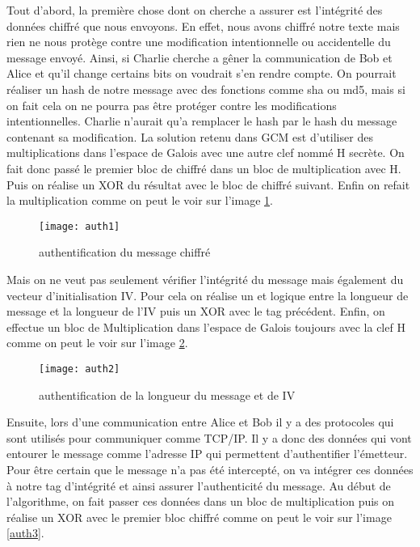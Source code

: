 Tout d'abord, la première chose dont on cherche a assurer est l'intégrité des données chiffré que nous envoyons. En effet, nous avons chiffré notre texte mais rien ne nous protège contre une modification intentionnelle ou accidentelle du message envoyé. Ainsi, si Charlie cherche a gêner la communication de Bob et Alice et qu'il change certains bits on voudrait s'en rendre compte. On pourrait réaliser un hash de notre message avec des fonctions comme sha ou md5, mais si on fait cela on ne pourra pas être protéger contre les modifications intentionnelles. Charlie n'aurait qu'a remplacer le hash par le hash du message contenant sa modification. La solution retenu dans GCM est d'utiliser des multiplications dans l'espace de Galois avec une autre clef nommé H secrète. On fait donc passé le premier bloc de chiffré dans un bloc de multiplication avec H. Puis on réalise un XOR du résultat avec le bloc de chiffré suivant. Enfin on refait la multiplication comme on peut le voir sur l'image \ref{auth1}.

\begin{figure}[!h]
  \centering
  \texttt{[image: auth1]}
  \caption{authentification du message chiffré}
  \label{auth1}
\end{figure}


Mais on ne veut pas seulement vérifier l'intégrité du message mais également du vecteur d'initialisation IV. Pour cela on réalise un \og et\fg{} logique entre la longueur de message et la longueur de l'IV
puis un XOR avec le tag précédent. Enfin, on effectue un bloc de Multiplication dans l'espace de Galois toujours avec la clef H comme on peut le voir sur l'image \ref{auth2}.

\begin{figure}[!h]
  \centering
  \texttt{[image: auth2]}
  \caption{authentification de la longueur du message et de IV}
  \label{auth2}
\end{figure}


Ensuite, lors d'une communication entre Alice et Bob il y a des protocoles qui sont utilisés pour communiquer comme TCP/IP. Il y a donc des données qui vont entourer le message comme l'adresse IP qui permettent d'authentifier l'émetteur. Pour être certain que le message n'a pas été intercepté, on va intégrer ces données à notre tag d'intégrité et ainsi assurer l'authenticité du message. 
Au début de l'algorithme, on fait passer ces données dans un bloc de multiplication puis on réalise un XOR avec le premier bloc chiffré comme on peut le voir sur l'image \ref{auth3}.

